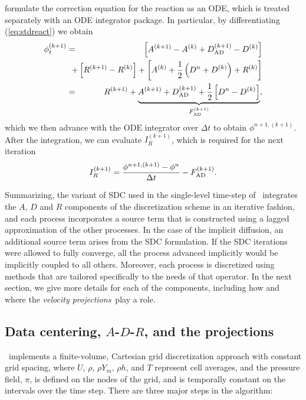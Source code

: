 formulate the correction equation for the 
reaction as an ODE, which is treated separately with an ODE integrator package.
In particular, by differentiating (\ref{eq:stdreact}) we obtain
\begin{eqnarray}
{\phi}^{(k+1)}_t &=& \left[ A^{(k+1)} - A^{(k)} + D_{\rm AD}^{(k+1)} - D^{(k)} \right]\nonumber\\
&&\hspace{-0.5cm}+ \left[R^{(k+1)} - R^{(k)}\right] + \left[A^{(k)} + \half\left(D^n + D^{(k)}\right) + R^{(k)}\right]\nonumber\\
&=& R^{(k+1)} + \underbrace{A^{(k+1)} + D_{\rm AD}^{(k+1)} + \half\left[D^n - D^{(k)}\right]}_{F_{\rm AD}^{(k+1)}}, \label{eq:MISDCint}
\end{eqnarray}
which we then advance with the ODE integrator over $\Delta t$ to obtain $\phi^{n+1,(k+1)}$.
After the integration, we can evaluate $I_R^{(k+1)}$, which is required for the next iteration
\begin{equation}
I_R^{(k+1)} = \frac{\phi^{n+1,(k+1)} - \phi^n}{\Delta t} - F_{\rm AD}^{(k+1)}.
\end{equation}

Summarizing, the variant of SDC used in the single-level time-step of \pelelm\ integrates the $A$, $D$ and $R$ components of the discretization scheme in an iterative fashion, and each process incorporates a source term that is constructed using a lagged approximation of the other processes. In the case of the implicit diffusion, an additional source term arises from the SDC formulation.  If the SDC iterations were allowed to fully converge, all the process advanced implicitly would be implicitly coupled to all others.  Moreover, each process is discretized using methods that are tailored specifically to the needs of that operator. In the next section, we give more details for each of the components, including how and where the \textit{velocity projections}\ play a role.


\subsection{Data centering, $A$-$D$-$R$, and the projections}
\pelelm\ implements a finite-volume, Cartesian grid discretization approach with constant grid spacing, where
$U$, $\rho$, $\rho Y_m$, $\rho h$, and $T$ represent cell averages, and the pressure field, $\pi$, is defined on the nodes
of the grid, and is temporally constant on the intervals over the time step. There are three major steps in the algorithm:\\

